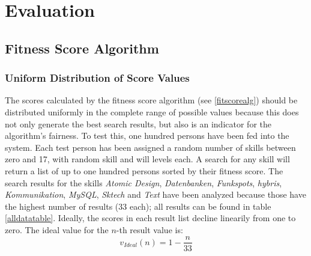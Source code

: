 \chapter{Evaluation}

%
%
%

\section{Fitness Score Algorithm}

\subsection{Uniform Distribution of Score Values}
The scores calculated by the fitness score algorithm (see \ref{fitscorealg}) should be distributed uniformly in the complete range of possible values because this does not only generate the best search results, but also is an indicator for the algorithm's fairness.
To test this, one hundred persons have been fed into the system. Each test person has been assigned a random number of skills between zero and 17, with random skill and will levels each. A search for any skill will return a list of up to one hundred persons sorted by their fitness score. The search results for the skills \textit{Atomic Design}, \textit{Datenbanken}, \textit{Funkspots}, \textit{hybris}, \textit{Kommunikation}, \textit{MySQL}, \textit{Sktech} and \textit{Text} have been analyzed because those have the highest number of results (33 each); all results can be found in table \ref{alldatatable}. Ideally, the scores in each result list decline linearily from one to zero. The ideal value for the $n$-th result value is:
\[
	v_{Ideal}(n) = 1 - \frac{n}{33}
\]

